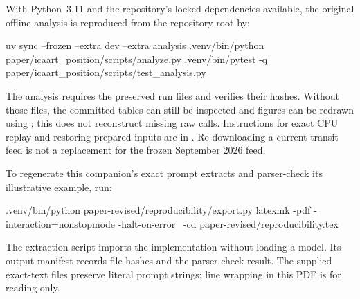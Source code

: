 \documentclass[11pt,a4paper]{scrartcl}
\begin{document}
With Python~3.11 and the repository's locked dependencies available, the original offline analysis is reproduced from the repository root by:
\begin{Code}
uv sync --frozen --extra dev --extra analysis
.venv/bin/python paper/icaart_position/scripts/analyze.py
.venv/bin/pytest -q paper/icaart_position/scripts/test_analysis.py
\end{Code}
The analysis requires the preserved run files and verifies their hashes. Without those files, the committed tables can still be inspected and figures can be redrawn using ; this does not reconstruct missing raw calls. Instructions for exact CPU replay and restoring prepared inputs are in . Re-downloading a current transit feed is not a replacement for the frozen September 2026 feed.

To regenerate this companion's exact prompt extracts and parser-check its illustrative example, run:
\begin{Code}
.venv/bin/python paper-revised/reproducibility/export.py
latexmk -pdf -interaction=nonstopmode -halt-on-error \
  -cd paper-revised/reproducibility.tex
\end{Code}
The extraction script imports the implementation without loading a model. Its output manifest records file hashes and the parser-check result. The supplied exact-text files preserve literal prompt strings; line wrapping in this PDF is for reading only.
\end{document}
